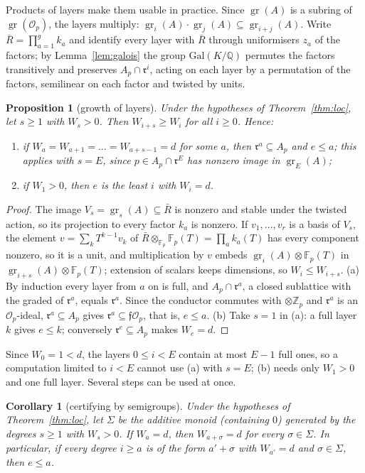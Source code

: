 \documentclass[11pt,a4paper]{article}
\newtheorem{proposition}[theorem]{Proposition}
\newtheorem{corollary}[theorem]{Corollary}
\theoremstyle{definition}
\newcommand{\ZZ}{\mathbb{Z}}
\newcommand{\QQ}{\mathbb{Q}}
\newcommand{\FF}{\mathbb{F}}
\newcommand{\cO}{\mathcal{O}}
\newcommand{\cf}{\mathfrak{f}}
\newcommand{\rad}{\mathfrak{r}}
\newcommand{\gr}{\operatorname{gr}}
\begin{document}
\noindent Products of layers make them usable in practice. Since $\gr(A)$ is a subring of
$\gr(\cO_p)$, the layers multiply: $\gr_i(A)\cdot\gr_j(A)\subseteq\gr_{i+j}(A)$. Write $\bar R=\prod_{a=1}^{g}k_a$ and
identify every layer with $\bar R$ through uniformisers $z_a$ of the factors; by Lemma~\ref{lem:galois} the group
$\mathrm{Gal}(K/\QQ)$ permutes the factors transitively and preserves $A_p\cap\rad^i$, acting on each layer by a
permutation of the factors, semilinear on each factor and twisted by units.

\begin{proposition}[growth of layers]\label{prop:cert}
Under the hypotheses of Theorem~\ref{thm:loc}, let $s\ge1$ with $W_s>0$. Then $W_{i+s}\ge W_i$ for all $i\ge0$. Hence:
\begin{enumerate}
\item[(a)] if $W_a=W_{a+1}=\dots=W_{a+s-1}=d$ for some $a$, then $\rad^a\subseteq A_p$ and $e\le a$; this applies with
 $s=E$, since $p\in A_p\cap\rad^E$ has nonzero image in $\gr_E(A)$;
\item[(b)] if $W_1>0$, then $e$ is the least $i$ with $W_i=d$.
\end{enumerate}
\end{proposition}

\begin{proof}
The image $V_s=\gr_s(A)\subseteq\bar R$ is nonzero and stable under the twisted action, so its projection to
every factor $k_a$ is nonzero. If $v_1,\dots,v_r$ is a basis of $V_s$, the element $v=\sum_k T^{k-1}v_k$ of
$\bar R\otimes_{\FF_p}\FF_p(T)=\prod_ak_a(T)$ has every component nonzero, so it is a unit, and multiplication by $v$
embeds $\gr_i(A)\otimes\FF_p(T)$ in $\gr_{i+s}(A)\otimes\FF_p(T)$; extension of scalars keeps dimensions, so
$W_i\le W_{i+s}$. (a) By induction every layer from $a$ on is full, and $A_p\cap\rad^a$, a closed sublattice with the
graded of $\rad^a$, equals $\rad^a$. Since the conductor commutes with $\otimes\ZZ_p$ and $\rad^a$ is an $\cO_p$-ideal,
$\rad^a\subseteq A_p$ gives $\rad^a\subseteq\cf\cO_p$, that is, $e\le a$. (b) Take $s=1$ in (a): a full layer $k$
gives $e\le k$; conversely $\rad^e\subseteq A_p$ makes $W_e=d$.
\end{proof}

\noindent Since $W_0=1<d$, the layers $0\le i<E$ contain at most $E-1$ full ones, so a computation limited to $i<E$
cannot use (a) with $s=E$; (b) needs only $W_1>0$ and one full layer. Several steps can be used at once.

\begin{corollary}[certifying by semigroups]\label{cor:semigrupo}
Under the hypotheses of Theorem~\ref{thm:loc}, let $\Sigma$ be the additive monoid (containing $0$) generated by the degrees $s\ge1$
with $W_s>0$. If $W_a=d$, then $W_{a+\sigma}=d$ for every $\sigma\in\Sigma$. In particular, if every degree $i\ge a$
is of the form $a'+\sigma$ with $W_{a'}=d$ and $\sigma\in\Sigma$, then $e\le a$.
\end{corollary}
\end{document}
